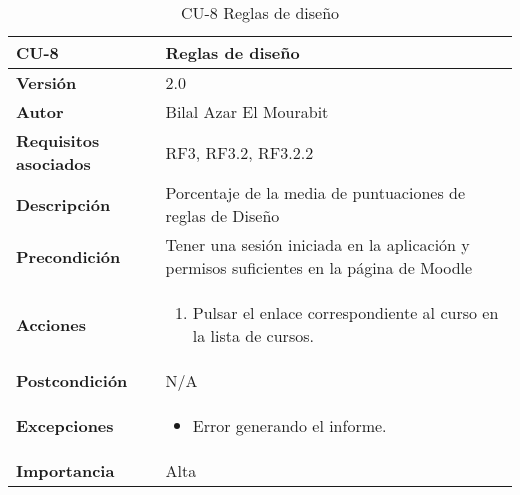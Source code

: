 \begin{table}[H]
	\centering
	\begin{tabularx}{\linewidth}{ p{} p{} }
		\toprule
		\textbf{CU-8}    & \textbf{Reglas de diseño}\\
		\toprule
		\textbf{Versión}              & 2.0    \\
		\textbf{Autor}                & Bilal Azar El Mourabit \\
		\textbf{Requisitos asociados} & RF3, RF3.2, RF3.2.2 \\
		\textbf{Descripción}          & Porcentaje de la media de puntuaciones de reglas de Diseño\\
    		\textbf{Precondición}         & Tener una sesión iniciada en la aplicación y permisos suficientes en la página de Moodle \\
		\textbf{Acciones}             & 
		\begin{enumerate}
			\def\labelenumi{\arabic{enumi}.}
			\tightlist
			\item Pulsar el enlace correspondiente al curso en la lista de cursos. 
		\end{enumerate}\\
		\textbf{Postcondición}        & N/A \\
		\textbf{Excepciones}          & \begin{itemize}
		    \item Error generando el informe.
		\end{itemize} \\
		\textbf{Importancia}          & Alta \\
		\bottomrule
	\end{tabularx}
	\caption{CU-8 Reglas de diseño}
\end{table}

